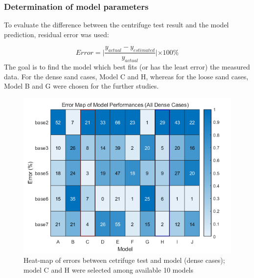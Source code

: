 \documentclass[a4paper, nobind]{templates/ociamthesis}
\begin{document}
\hypertarget{determination-of-model-parameters}{%
\subsubsection{Determination of model parameters}\label{determination-of-model-parameters}}

To evaluate the difference between the centrifuge test result and the model prediction, residual error was used:

\[
Error = \lvert \frac{y_{actual}-y_{estimated}}{y_{actual}}\lvert \times 100\% 
\]
The goal is to find the model which best fits (or has the least error) the measured data.
For the dense sand cases, Model C and H, whereas for the loose sand cases, Model B and G were chosen for the further studies.

\begin{figure}[H]
\includegraphics[width=1\linewidth]{myfigureeeeee/errormap_emc} \caption{Heat-map of errors between cetrifuge test and model (dense cases); model C and H were selected among available 10 models}\label{fig:unnamed-chunk-44}
\end{figure}
\end{document}
